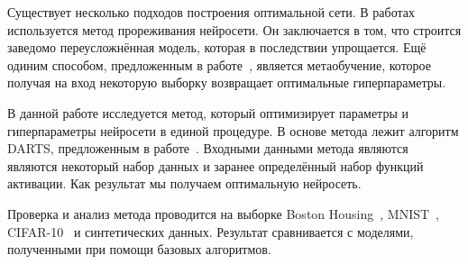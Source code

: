 \documentclass[12pt,twoside]{article}
\begin{document}
	Существует несколько подходов построения оптимальной сети. В работах~\cite{cun1990, graves2011} используется метод прореживания нейросети. Он заключается в том, что строится заведомо переусложнённая модель, которая в последствии упрощается. Ещё одиним способом, предложенным в работе~\cite{Maclaurin:2015:GHO:3045118.3045343}, является метаобучение, которое получая на вход некоторую выборку возвращает оптимальные гиперпараметры.
	
	В данной работе исследуется метод, который оптимизирует параметры и гиперпараметры нейросети в единой процедуре. В основе метода лежит алгоритм DARTS, предложенным в работе~\cite{liu2018darts}. Входными данными метода являются являются некоторый набор данных и заранее определённый набор функций активации. Как результат мы получаем оптимальную нейросеть.
	
	Проверка и анализ метода проводится на выборке Boston Housing~\cite{Boston}, MNIST~\cite{MNIST},  CIFAR-10~\cite{CIFAR-10} и синтетических данных. Результат сравнивается с моделями, полученными при помощи базовых алгоритмов.
	 



\end{document}
